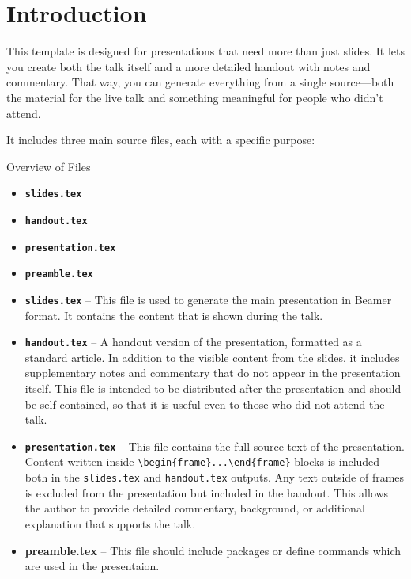 
\section{Introduction}

This template is designed for presentations that need more than just slides. It
lets you create both the talk itself and a more detailed handout with notes and
commentary. That way, you can generate everything from a single source—both the
material for the live talk and something meaningful for people who didn’t
attend.

It includes three main source files, each with a specific purpose:

\begin{frame}[fragile]{Overview of Files}
  \begin{itemize}
   \item \textbf{\texttt{slides.tex}} 
   \item \textbf{\texttt{handout.tex}}
   \item \textbf{\texttt{presentation.tex}}
   \item \textbf{\texttt{preamble.tex}}
  \end{itemize}
\end{frame}
\begin{itemize}
  \item \textbf{\texttt{slides.tex}} – This file is used to generate the main presentation in Beamer format. It contains the content that is shown during the talk.
  
  \item \textbf{\texttt{handout.tex}} – A handout version of the presentation, formatted as a standard article. In addition to the visible content from the slides, it includes supplementary notes and commentary that do not appear in the presentation itself. This file is intended to be distributed after the presentation and should be self-contained, so that it is useful even to those who did not attend the talk.
  
  \item \textbf{\texttt{presentation.tex}} – This file contains the full source text of the presentation. Content written inside \verb|\begin{frame}...\end{frame}| blocks is included both in the \texttt{slides.tex} and \texttt{handout.tex} outputs. Any text outside of frames is excluded from the presentation but included in the handout. This allows the author to provide detailed commentary, background, or additional explanation that supports the talk.

  \item  \textbf{preamble.tex} – This file should include packages or define commands which are used in the presentaion. 
\end{itemize}

